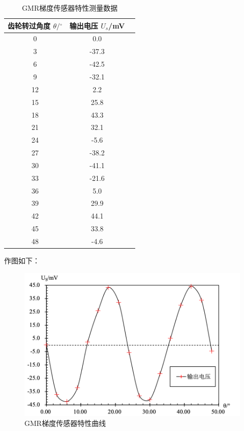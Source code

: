 \documentclass{thuemp}
\begin{document}
\begin{table}[H]
    \centering
    \captionnamefont{\wuhao\bf\heiti}
    \captiontitlefont{\wuhao\bf\heiti}
    \caption{GMR梯度传感器特性测量数据} \label{tab:gmr_gradient}
    \liuhao
    \begin{tabular}{ccc}
        \toprule
        齿轮转过角度 $\theta/\mathrm{^\circ}$ & 输出电压 $U_s$/\si{\milli\volt} \\
        \midrule
        0 & 0.0   \\
        3 & -37.3 \\
        6 & -42.5 \\
        9 & -32.1 \\
       12 & 2.2   \\
       15 & 25.8  \\
       18 & 43.3  \\
       21 & 32.1  \\
       24 & -5.6  \\
       27 & -38.2 \\
       30 & -41.1 \\
       33 & -21.6 \\
       36 & 5.0   \\
       39 & 29.9  \\
       42 & 44.1  \\
       45 & 33.8  \\
       48 & -4.6  \\
        \bottomrule
    \end{tabular}
\end{table}

作图如下：

\begin{figure}[H]
    \centering
    \includegraphics[width=1.0\linewidth]{../Data/GMR-Plot-05-excel.png}
    \caption{GMR梯度传感器特性曲线} \label{fig:gmr_gradient}
\end{figure}
\end{document}
